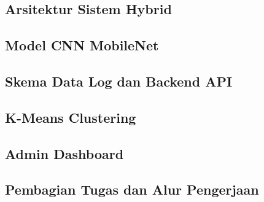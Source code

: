 \documentclass[12pt,a4paper,oneside,openany]{report}
\begin{document}
\subsection{Arsitektur Sistem Hybrid}
\label{subsec:arsitektur}

\subsection{Model CNN MobileNet}
\label{subsec:cnn-model}

\subsection{Skema Data Log dan Backend API}
\label{subsec:data-log-api}

\subsection{K-Means Clustering}
\label{subsec:kmeans-clustering}

\subsection{Admin Dashboard}
\label{subsec:admin-dashboard}

\subsection{Pembagian Tugas dan Alur Pengerjaan}
\label{subsec:pembagian-tugas}
\end{document}

